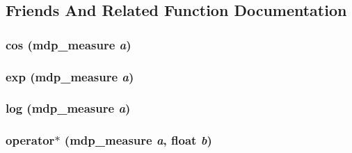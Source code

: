 \subsection{Friends And Related Function Documentation}
\hypertarget{classmdp__measure_af1f3876a19982932b4c6a1011f049350}{
\subsubsection[{cos}]{ cos ({\bf mdp\_\-measure} {\em a})}}
\label{classmdp__measure_af1f3876a19982932b4c6a1011f049350}
\hypertarget{classmdp__measure_aa27ae5954c296694bf711dbec8fb312a}{
\subsubsection[{exp}]{ exp ({\bf mdp\_\-measure} {\em a})}}
\label{classmdp__measure_aa27ae5954c296694bf711dbec8fb312a}
\hypertarget{classmdp__measure_a4762a50b84b4f961dd46f2bb395b2506}{
\subsubsection[{log}]{ log ({\bf mdp\_\-measure} {\em a})}}
\label{classmdp__measure_a4762a50b84b4f961dd46f2bb395b2506}
\hypertarget{classmdp__measure_aa5dcdce1ad85ba147460781e805dae6d}{
\subsubsection[{operator$\ast$}]{ operator$\ast$ ({\bf mdp\_\-measure} {\em a}, \/  float {\em b})}}
\label{classmdp__measure_aa5dcdce1ad85ba147460781e805dae6d}
